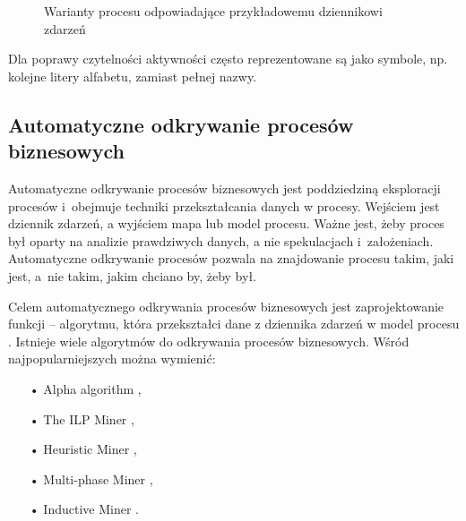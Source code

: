 \begin{figure}[H]
	\caption{\label{fig:process_variants_example}Warianty procesu odpowiadające przykładowemu dziennikowi zdarzeń}
\end{figure}

Dla poprawy czytelności aktywności często reprezentowane są jako symbole, np. kolejne litery alfabetu, zamiast pełnej nazwy.

\subsection{Automatyczne odkrywanie procesów biznesowych}
\label{sec:discovery}

Automatyczne odkrywanie procesów biznesowych jest poddziedziną eksploracji procesów i~obejmuje techniki przekształcania danych w procesy. Wejściem jest dziennik zdarzeń, a wyjściem mapa lub model procesu. Ważne jest, żeby proces był oparty na analizie prawdziwych danych, a nie spekulacjach i~założeniach. Automatyczne odkrywanie procesów pozwala na znajdowanie procesu takim, jaki jest, a~nie takim, jakim chciano by, żeby był.

Celem automatycznego odkrywania procesów biznesowych jest zaprojektowanie funkcji -- algorytmu, która przekształci dane z dziennika zdarzeń w model procesu \cite{pm-book}. Istnieje wiele algorytmów do odkrywania procesów biznesowych. Wśród najpopularniejszych można wymienić:
\begin{itemize}
  \item[•] Alpha algorithm \cite{alpha-algorithm},
  \item[•] The ILP Miner \cite{ILP-miner},
  \item[•] Heuristic Miner \cite{heuristics-miner},
  \item[•] Multi-phase Miner \cite{multi-phase-miner},
  \item[•] Inductive Miner \cite{inductive-miner}.
\end{itemize}


